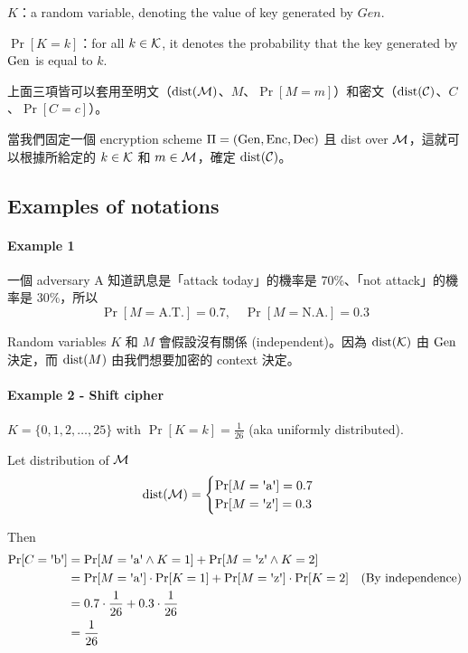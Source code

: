 \(K\)：a random variable, denoting the value of key generated by \(Gen\).

\(\Pr[K = k]\)：for all \(k \in \operatorname{\mathcal{K}}\), it denotes the probability that the key generated by \(\operatorname{Gen}\) is equal to \(k\).

上面三項皆可以套用至明文（\(\operatorname{dist}(\operatorname{\mathcal{M}})\)、\(M\)、\(\Pr[M = m]\)）和密文（\(\operatorname{dist}(\operatorname{\mathcal{C}})\)、\(C\)、\(\Pr[C = c]\)）。

當我們固定一個 encryption scheme \(\Pi = (\operatorname{Gen}, \operatorname{Enc}, \operatorname{Dec})\) 且 dist over \(\operatorname{\mathcal{M}}\)，這就可以根據所給定的 \(k \in \operatorname{\mathcal{K}}\) 和 \(m \in \operatorname{\mathcal{M}}\)，確定 \(\operatorname{dist}(\operatorname{\mathcal{C}})\)。


\subsection{Examples of notations}


\paragraph{Example 1}

一個 adversary A 知道訊息是「attack today」的機率是 70\%、「not attack」的機率是 30\%，所以
\[\Pr[M=\mathrm{A.T.}] = 0.7, \quad \Pr[M=\mathrm{N.A.}] = 0.3\]

Random variables \(K\) 和 \(M\) 會假設沒有關係 (independent)。因為 \(\operatorname{dist}(\operatorname{\mathcal{K}})\) 由 \(\operatorname{Gen}\) 決定，而 \(\operatorname{dist}(M)\) 由我們想要加密的 context 決定。


\paragraph{Example 2 - Shift cipher}

\(K = \{0, 1, 2, \ldots, 25\}\) with \(\Pr[K = k] = \displaystyle{\frac{1}{26}}\) (aka uniformly distributed).

Let distribution of \(\operatorname{\mathcal{M}}\)
\begin{equation*}
	\dist(\M) =
		\begin{cases}
			\Pr[M = \letter{a}] = 0.7 \\
			\Pr[M = \letter{z}] = 0.3
		\end{cases}
\end{equation*}

Then
\begin{align*}
	\Pr[C = \letter{b}] &= 
			\Pr[M = \letter{a} \wedge K = 1] +
			\Pr[M = \letter{z} \wedge K = 2] \\
		&= \Pr[M = \letter{a}] \cdot \Pr[K = 1] + 
			\Pr[M = \letter{z}] \cdot \Pr[K = 2]
			\quad \text{(By independence)} \\
		&= 0.7 \cdot \frac{1}{26} + 0.3 \cdot \frac{1}{26} \\
		&= \frac{1}{26}
\end{align*}

